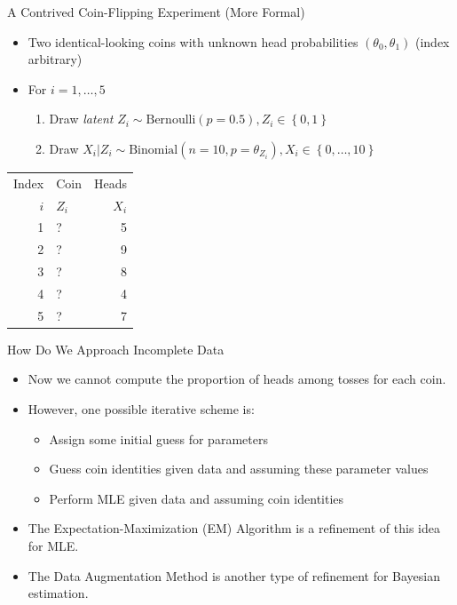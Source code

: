\documentclass[dvipdfmx,bigger,aspectratio=169]{beamer}
\begin{document}
\begin{frame}[label={sec:org973aae4}]{A Contrived Coin-Flipping Experiment (More Formal)}
\begin{itemize}
\item Two identical-looking coins with unknown head probabilities \((\theta_{0},\theta_{1})\) (index arbitrary)
\item For \(i = 1, \dots, 5\)
\begin{enumerate}
\item Draw \emph{latent} \(Z_{i} \sim \text{Bernoulli}(p = 0.5), Z_{i} \in \left\{ 0,1 \right\}\)
\item Draw \(X_{i} | Z_{i} \sim \text{Binomial}(n = 10, p = \theta_{Z_{i}}), X_{i} \in \left\{ 0, \dots, 10 \right\}\)
\end{enumerate}
\end{itemize}
\begin{center}
\begin{tabular}{rlr}
Index & Coin & Heads\\
\(i\) & \(Z_{i}\) & \(X_{i}\)\\
\hline
1 & ? & 5\\
2 & ? & 9\\
3 & ? & 8\\
4 & ? & 4\\
5 & ? & 7\\
\end{tabular}
\end{center}
\end{frame}

\begin{frame}[label={sec:orgbe50256}]{How Do We Approach Incomplete Data}
\begin{itemize}
\item Now we cannot compute the proportion of heads among tosses for each coin.
\item However, one possible iterative scheme is:
\begin{itemize}
\item Assign some initial guess for parameters
\item Guess coin identities given data and assuming these parameter values
\item Perform MLE given data and assuming coin identities
\end{itemize}
\item The Expectation-Maximization (EM) Algorithm \cite{dempsterMaximumLikelihoodIncomplete1977} is a refinement of this idea for MLE.
\item The Data Augmentation Method \cite{tannerCalculationPosteriorDistributions1987} is another type of refinement for Bayesian estimation.
\end{itemize}
\end{frame}
\end{document}
